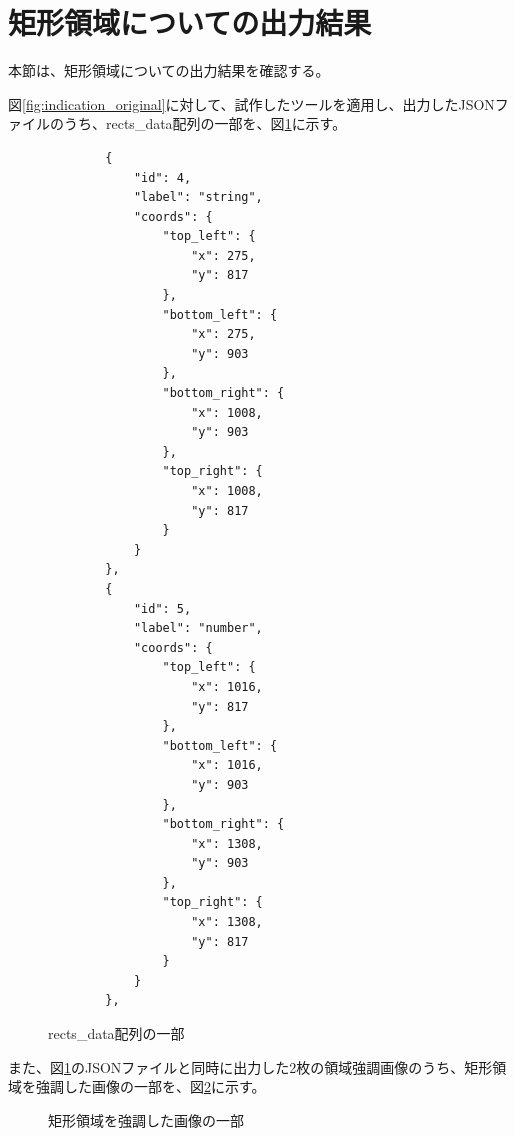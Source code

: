\section{矩形領域についての出力結果}\label{sec:result_rect}
本節は、矩形領域についての出力結果を確認する。

図\ref{fig:indication_original}に対して、試作したツールを適用し、出力したJSONファイルのうち、rects\_data配列の一部を、図\ref{fig:rects_data_json}に示す。
\lstset{language=}
\begin{figure}[tp]
    \begin{lstlisting}
        {
            "id": 4,
            "label": "string",
            "coords": {
                "top_left": {
                    "x": 275,
                    "y": 817
                },
                "bottom_left": {
                    "x": 275,
                    "y": 903
                },
                "bottom_right": {
                    "x": 1008,
                    "y": 903
                },
                "top_right": {
                    "x": 1008,
                    "y": 817
                }
            }
        },
        {
            "id": 5,
            "label": "number",
            "coords": {
                "top_left": {
                    "x": 1016,
                    "y": 817
                },
                "bottom_left": {
                    "x": 1016,
                    "y": 903
                },
                "bottom_right": {
                    "x": 1308,
                    "y": 903
                },
                "top_right": {
                    "x": 1308,
                    "y": 817
                }
            }
        },
    \end{lstlisting}
    \caption{rects\_data配列の一部}\label{fig:rects_data_json}
\end{figure}
また、図\ref{fig:rects_data_json}のJSONファイルと同時に出力した2枚の領域強調画像のうち、矩形領域を強調した画像の一部を、図\ref{fig:highlighted_rects_part}に示す。
\begin{figure}[tp]
    \begin{center}
        \caption{矩形領域を強調した画像の一部}
        \label{fig:highlighted_rects_part}
    \end{center}
\end{figure}

